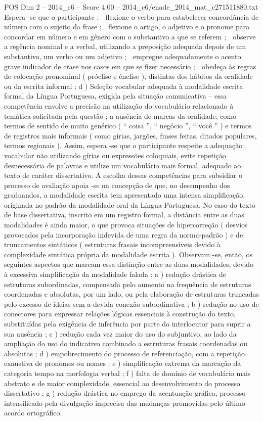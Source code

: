 \begin{textsample}{POS Dim 2 – 2014\_c6 – Score 4.00 – 2014\_c6/enade\_2014\_mat\_c271511880.txt}
Espera -se que o participante :  flexione o verbo para estabelecer concordância de número com o sujeito da frase ;  flexione o artigo, o adjetivo e o pronome para concordar em número e em gênero com o substantivo a que se referem ;  observe a regência nominal e a verbal, utilizando a preposição adequada depois de um substantivo, um verbo ou um adjetivo ;  empregue adequadamente o acento grave indicador de crase nos casos em que se fizer necessário ;  obedeça às regras de colocação pronominal ( próclise e ênclise ), distintas dos hábitos da oralidade ou da escrita informal ; d ) Seleção vocabular adequada à modalidade escrita formal da Língua Portuguesa, exigida pela situação comunicativa – essa competência envolve a precisão na utilização do vocabulário relacionado à temática solicitada pela questão ; a ausência de marcas da oralidade, como termos de sentido de muito genérico ( “ coisa ”, “ negócio ”, “ você ” ) e termos de registros mais informais ( como gírias, jargões, frases feitas, ditados populares, termos regionais ).
Assim, espera -se que o participante respeite a adequação vocabular não utilizando gírias ou expressões coloquiais, evite repetição desnecessária de palavras e utilize um vocabulário mais formal, adequado ao texto de caráter dissertativo.
A escolha dessas competências para subsidiar o processo de avaliação apoia -se na concepção de que, no desempenho dos graduandos, a modalidade escrita tem apresentado uma intensa simplificação, originada no padrão da modalidade oral da Língua Portuguesa.
No caso do texto de base dissertativa, inscrito em um registro formal, a distância entre as duas modalidades é ainda maior, o que provoca situações de hipercorreção ( desvios provocados pela incorporação indevida de uma regra da norma-padrão ) e de truncamentos sintáticos ( estruturas frasais incompreensíveis devido à complexidade sintática própria da modalidade escrita ).
Observam -se, então, os seguintes aspectos que marcam essa distinção entre as duas modalidades, devido à excessiva simplificação da modalidade falada : a ) redução drástica de estruturas subordinadas, compensada pelo aumento na frequência de estruturas coordenadas e absolutas, por um lado, ou pela elaboração de estruturas truncadas pelo excesso de ideias sem a devida conexão subordinativa ; b ) redução no uso de conectores para expressar relações lógicas essenciais à construção do texto, substituídas pela exigência de inferência por parte do interlocutor para suprir a sua ausência ; c ) redução cada vez maior do uso do subjuntivo, ao lado da ampliação do uso do indicativo combinado a estruturas frasais coordenadas ou absolutas ; d ) empobrecimento do processo de referenciação, com a repetição exaustiva de pronomes ou nomes ; e ) simplificação extrema da marcação da categoria tempo na morfologia verbal ; f ) falta de domínio de vocabulário mais abstrato e de maior complexidade, essencial ao desenvolvimento do processo dissertativo ; g ) redução drástica no emprego da acentuação gráfica, processo intensificado pela divulgação imprecisa das mudanças promovidas pelo último acordo ortográfico.

\end{textsample}
